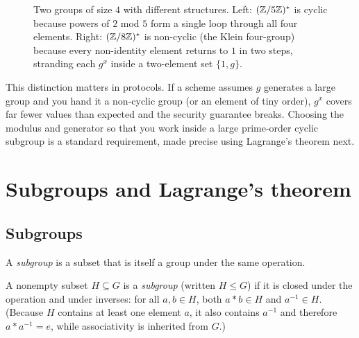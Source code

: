 \begin{figure}[htbp]
\caption{Two groups of size $4$ with different structures. Left: $(\mathbb{Z}/5\mathbb{Z})^{*}$ is cyclic because powers of $2$ mod $5$ form a single loop through all four elements. Right: $(\mathbb{Z}/8\mathbb{Z})^{*}$ is non-cyclic (the Klein four-group) because every non-identity element returns to $1$ in two steps, stranding each $g^x$ inside a two-element set $\{1, g\}$.}
\label{fig:ch05-cyclic-vs-klein}
\end{figure}

This distinction matters in protocols. If a scheme assumes $g$ generates a large group and you hand it a
non-cyclic group (or an element of tiny order), $g^x$ covers far fewer values than expected and the security guarantee breaks. Choosing the modulus and generator so that you work inside a large prime-order cyclic subgroup is a standard requirement, made precise using Lagrange's theorem next.

\section{Subgroups and Lagrange's theorem}
\label{ch05:lagrange}

\subsection{Subgroups}

A \emph{subgroup} is a subset that is itself a group under the same operation.

\begin{definition}[Subgroup]
\label{ch05:def-subgroup}
A nonempty subset $H \subseteq G$ is a \emph{subgroup} (written $H \le G$) if it is closed
under the operation and under inverses: for all $a,b \in H$, both $a \ast b \in H$ and
$a^{-1} \in H$. (Because $H$ contains at least one element $a$, it also contains $a^{-1}$ and therefore $a \ast a^{-1} = e$, while associativity is inherited from $G$.)
\end{definition}

